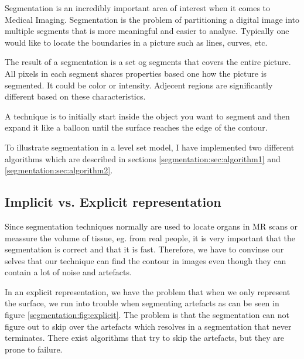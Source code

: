
Segmentation is an incredibly important area of interest when it comes to Medical Imaging. Segmentation is the problem of partitioning a digital image into multiple segments that is more meaningful and easier to analyse. Typically one would like to locate the boundaries in a picture such as lines, curves, etc.

The result of a segmentation is a set og segments that covers the entire picture. All pixels in each segment shares properties based one how the picture is segmented. It could be color or intensity. Adjecent regions are significantly different based on these characteristics.

A technique is to initially start inside the object you want to segment and then expand it like a balloon until the surface reaches the edge of the contour.

To illustrate segmentation in a level set model, I have implemented two different algorithms which are described in sections \vref{segmentation:sec:algorithm1} and \vref{segmentation:sec:algorithm2}.

\subsection{Implicit vs. Explicit representation}

Since segmentation techniques normally are used to locate organs in MR scans or meassure the volume of tissue, eg. from real people, it is very important that the segmentation is correct and that it is fast. Therefore, we have to convinse our selves that our technique can find the contour in images even though they can contain a lot of noise and artefacts. 

In an explicit representation, we have the problem that when we only represent the surface, we run into trouble when segmenting artefacts as can be seen in figure \vref{segmentation:fig:explicit}. The problem is that the segmentation can not figure out to skip over the artefacts which resolves in a segmentation that never terminates. There exist algorithms that try to skip the artefacts, but they are prone to failure.


